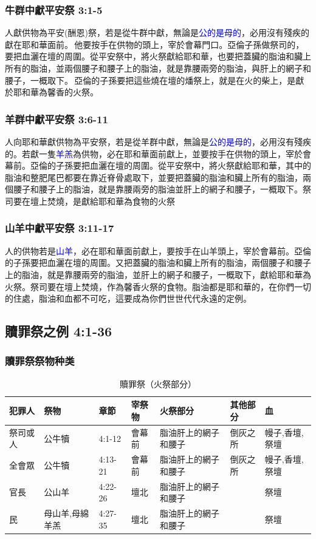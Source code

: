 \subsubsection{牛群中獻平安祭 3:1-5}
人獻供物為平安(酬恩)祭，若是從牛群中獻，無論是\textcolor{blue}{公的是母的}，必用沒有殘疾的獻在耶和華面前。 他要按手在供物的頭上，宰於會幕門口。亞倫子孫做祭司的，要把血灑在壇的周圍。從平安祭中，將火祭獻給耶和華，也要把蓋臟的脂油和臟上所有的脂油，並兩個腰子和腰子上的脂油，就是靠腰兩旁的脂油，與肝上的網子和腰子，一概取下。 亞倫的子孫要把這些燒在壇的燔祭上，就是在火的柴上，是獻於耶和華為馨香的火祭。

\subsubsection{羊群中獻平安祭 3:6-11}
人向耶和華獻供物為平安祭，若是從羊群中獻，無論是\textcolor{blue}{公的是母的}，必用沒有殘疾的。若獻一隻\textcolor{blue}{羊羔}為供物，必在耶和華面前獻上，並要按手在供物的頭上，宰於會幕前。亞倫的子孫要把血灑在壇的周圍。從平安祭中，將火祭獻給耶和華，其中的脂油和整肥尾巴都要在靠近脊骨處取下，並要把蓋臟的脂油和臟上所有的脂油，兩個腰子和腰子上的脂油，就是靠腰兩旁的脂油並肝上的網子和腰子，一概取下。祭司要在壇上焚燒，是獻給耶和華為食物的火祭

\subsubsection{山羊中獻平安祭 3:11-17}
人的供物若是\textcolor{blue}{山羊}，必在耶和華面前獻上，要按手在山羊頭上，宰於會幕前。亞倫的子孫要把血灑在壇的周圍。又把蓋臟的脂油和臟上所有的脂油，兩個腰子和腰子上的脂油，就是靠腰兩旁的脂油，並肝上的網子和腰子，一概取下，獻給耶和華為火祭。祭司要在壇上焚燒，作為馨香火祭的食物。脂油都是耶和華的，在你們一切的住處，脂油和血都不可吃，這要成為你們世世代代永遠的定例。

\subsection{贖罪祭之例 4:1-36}
\subsubsection{贖罪祭祭物种类}

\begin{table}[H] 
\centering
\begin{tabular}{|l|l|l|l|l|l|l|}\hline\hline
  犯罪人&   祭物& 章節&宰祭物& 火祭部分 & 其他部分&血 \\ \hline
   祭司或人&公牛犢&4:1-12&會幕前& 脂油肝上的網子和腰子& 倒灰之所 &幔子,香壇,祭壇\\\hline
全會眾&公牛犢& 4:13-21&會幕前&脂油肝上的網子和腰子&倒灰之所  &幔子,香壇,祭壇\\ \hline
 官長&公山羊&4:22-26&壇北&脂油肝上的網子和腰子&&祭壇 \\ \hline
  民&母山羊,母綿羊羔&4:27-35&壇北&脂油肝上的網子和腰子&&祭壇 \\ \hline
     \end{tabular}
\caption{贖罪祭（火祭部分）}
\end{table}

